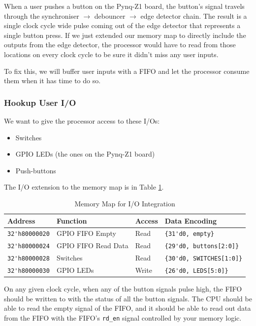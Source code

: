 \documentclass[11pt]{article}
\begin{document}
When a user pushes a button on the Pynq-Z1 board, the button's signal travels through the synchroniser $\rightarrow$ debouncer $\rightarrow$ edge detector chain.
The result is a single clock cycle wide pulse coming out of the edge detector that represents a single button press.
If we just extended our memory map to directly include the outputs from the edge detector, the processor would have to read from those locations on every clock cycle to be sure it didn't miss any user inputs.

To fix this, we will buffer user inputs with a FIFO and let the processor consume them when it has time to do so.

\subsubsection{Hookup User I/O}
We want to give the processor access to these I/Os:

\begin{itemize}
  \item Switches
  \item GPIO LEDs (the ones on the Pynq-Z1 board)
  \item Push-buttons
\end{itemize}

The I/O extension to the memory map is in Table \ref{mem_map2}.

\begin{table}[hbt]
  \begin{center}
    \caption{Memory Map for I/O Integration}
    \label{mem_map2}
    \begin{tabular}{l l l l}
      \toprule
      \textbf{Address} & \textbf{Function} & \textbf{Access} & \textbf{Data Encoding}\\
      \midrule
      \verb|32'h80000020| & GPIO FIFO Empty & Read & \verb|{31'd0, empty}| \\
      \verb|32'h80000024| & GPIO FIFO Read Data & Read & \verb|{29'd0, buttons[2:0]}| \\
      \midrule
      \verb|32'h80000028| & Switches & Read & \verb|{30'd0, SWITCHES[1:0]}| \\
      \midrule
      \verb|32'h80000030| & GPIO LEDs & Write & \verb|{26'd0, LEDS[5:0]}| \\
      \midrule
    \end{tabular}
  \end{center}
\end{table}

On any given clock cycle, when any of the button signals pulse high, the FIFO should be written to with the status of all the button signals.
The CPU should be able to read the empty signal of the FIFO, and it should be able to read out data from the FIFO with the FIFO's \verb|rd_en| signal controlled by your memory logic.
\end{document}
